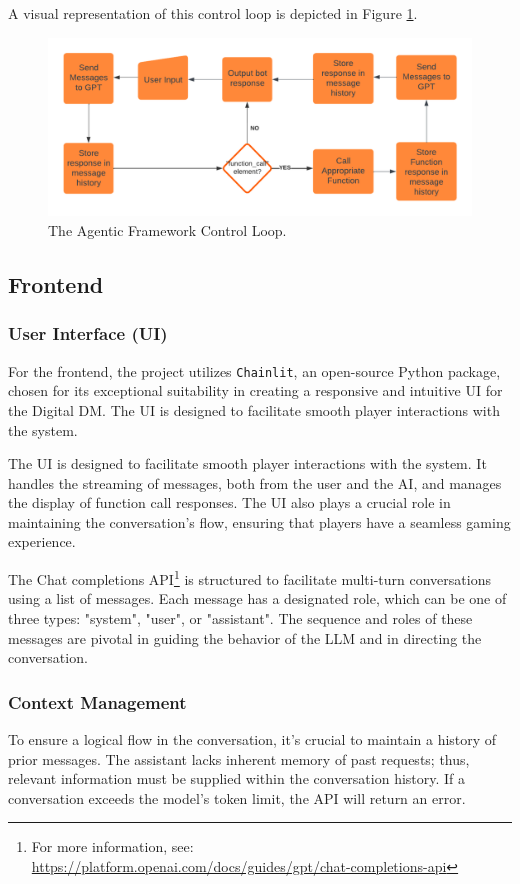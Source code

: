 \documentclass[letterpaper]{article}
\begin{document}
A visual representation of this control loop is depicted in Figure \ref{fig:control_loop}.

\begin{figure}[h]
    \centering
    \includegraphics[width=\linewidth]{control_loop.png}
    \caption{The Agentic Framework Control Loop.}
    \label{fig:control_loop}
\end{figure}

\subsection{Frontend}
\subsubsection{User Interface (UI)}
For the frontend, the project utilizes \texttt{Chainlit}, an open-source Python package, chosen for its exceptional suitability in creating a responsive and intuitive UI for the Digital DM. The UI is designed to facilitate smooth player interactions with the system.

The UI is designed to facilitate smooth player interactions with the system. It handles the streaming of messages, both from the user and the AI, and manages the display of function call responses. The UI also plays a crucial role in maintaining the conversation's flow, ensuring that players have a seamless gaming experience.

The Chat completions API\footnote{For more information, see: \url{https://platform.openai.com/docs/guides/gpt/chat-completions-api}} is structured to facilitate multi-turn conversations using a list of messages. Each message has a designated role, which can be one of three types: "system", "user", or "assistant". The sequence and roles of these messages are pivotal in guiding the behavior of the LLM and in directing the conversation.

\subsubsection{Context Management}
To ensure a logical flow in the conversation, it's crucial to maintain a history of prior messages. The assistant lacks inherent memory of past requests; thus, relevant information must be supplied within the conversation history. If a conversation exceeds the model’s token limit, the API will return an error.
\end{document}
